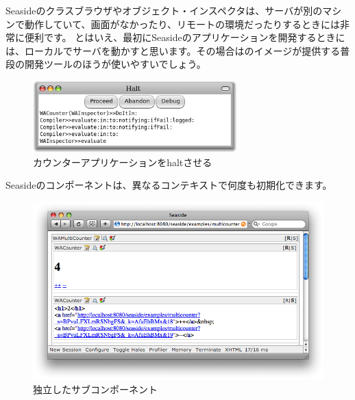 \documentclass[a4paper,10pt,twoside]{book}
\begin{document}
Seasideのクラスブラウザやオブジェクト・インスペクタは、サーバが別のマシンで動作していて、画面がなかったり、リモートの環境だったりするときには非常に便利です。
とはいえ、最初にSeasideのアプリケーションを開発するときには、ローカルでサーバを動かすと思います。その場合は\pharo のイメージが提供する普段の開発ツールのほうが使いやすいでしょう。

\begin{figure}[ht]
\begin{center}
\includegraphics[width=0.7\textwidth]{haltingCounter}
\caption{カウンターアプリケーションをhaltさせる}
\end{center}
\end{figure}


Seasideのコンポーネントは、異なるコンテキストで何度も初期化できます。

\begin{figure}[ht]
\begin{center}
\includegraphics[width=\textwidth]{multiCounterHalos}
\caption{独立したサブコンポーネント}
\end{center}
\end{figure}
\end{document}
